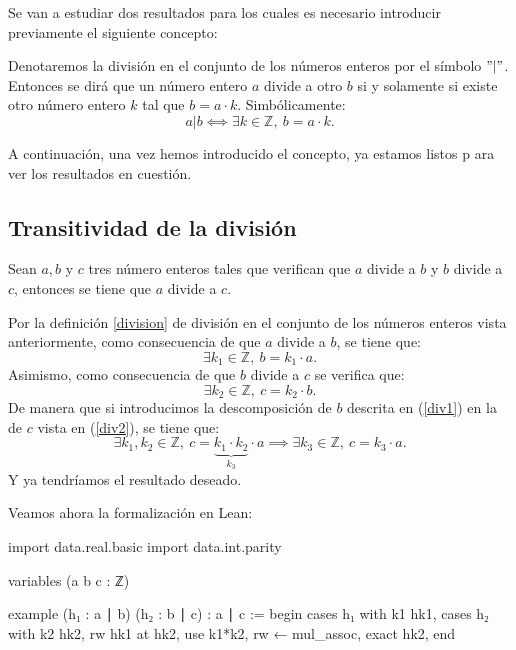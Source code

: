 Se van a estudiar dos resultados para los cuales es necesario
introducir previamente el siguiente concepto:
\begin{definicion}\label{division}
  Denotaremos la división en el conjunto de los números enteros por el símbolo
   \( "|" \). Entonces se dirá que un número entero \(a\) divide a otro \(b\)
  si y solamente si existe otro número entero \(k\) tal que \(b=a · k\).
  Simbólicamente:
  \begin{equation}
  a|b  ⟺  ∃ k ∈ ℤ, \ b=a · k.
  \end{equation}
\end{definicion}

A continuación, una vez hemos introducido el concepto, ya estamos listos p
ara ver los resultados en cuestión.

\subsection{Transitividad de la división}
\begin{teorema}
  Sean \(a, b\) y \(c\) tres número enteros tales que verifican
  que \(a\) divide a \(b\) y \(b\) divide a \(c\),
  entonces se tiene que \(a\) divide a \(c\).
\end{teorema}
\begin{demostracion}
  Por la definición \ref{division} de división en el conjunto
  de los números enteros vista anteriormente, como
  consecuencia de que \(a\) divide a \(b\), se tiene que:
  \begin{equation}\label{div1}
  ∃ k_1 ∈ ℤ, \ b=k_1 · a.
  \end{equation}
  Asimismo, como consecuencia de que \(b\) divide a \(c\) se
  verifica que:
  \begin{equation}\label{div2}
  ∃ k_2 ∈ ℤ, \ c=k_2 · b.
  \end{equation}
  De manera que si introducimos la descomposición de \(b\) descrita
  en (\ref{div1}) en la de \(c\) vista en (\ref{div2}), se tiene que:
  \begin{equation}
  ∃ k_1, k_2 ∈ ℤ, \ c=\underbrace{k_1 · k_2}_{k_3} · a
  ⟹ ∃ k_3 ∈ ℤ, \ c=k_3 · a .
  \end{equation}
  Y ya tendríamos el resultado deseado.
\end{demostracion}

Veamos ahora la formalización en Lean:
\begin{leancode}
import data.real.basic
import data.int.parity

variables (a b c : ℤ)

example (h₁ : a ∣ b) (h₂ : b ∣ c) : a ∣ c :=
begin
cases h₁ with k1 hk1,
cases h₂ with k2 hk2,
rw hk1 at hk2,
use k1*k2,
rw ← mul_assoc,
exact hk2,
end
\end{leancode}

